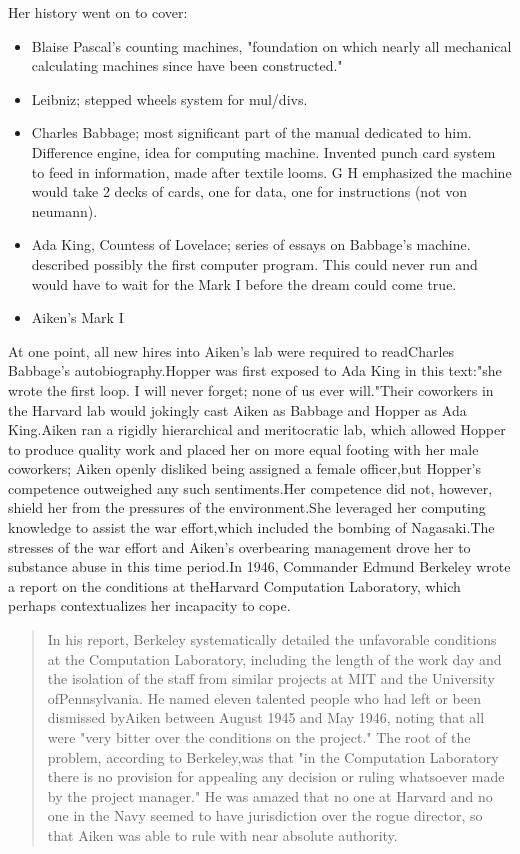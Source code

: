 Her history went on to cover:
\begin{itemize}
  \item Blaise Pascal's counting machines, "foundation on which
    nearly all mechanical
    calculating machines since have been constructed."
  \item Leibniz; stepped wheels system for mul/divs.
  \item Charles Babbage; most significant part of the manual dedicated to him.
    Difference engine, idea for computing machine. Invented punch card system to
    feed in information, made after textile looms. G H emphasized the
    machine would
    take 2 decks of cards, one for data, one for instructions (not
    von neumann).
  \item Ada King, Countess of Lovelace; series of essays on Babbage's machine.
    described possibly the first computer program. This could never
    run and would
    have to wait for the Mark I before the dream could come true.
  \item Aiken's Mark I
\end{itemize}

At one point, all new hires into Aiken's lab were
required to readCharles Babbage's autobiography.Hopper was first
exposed to Ada King in this text:"she wrote the first loop. I will
never forget; none of us ever will."Their coworkers in the Harvard
lab would jokingly cast Aiken as Babbage and Hopper as Ada King.Aiken
ran a rigidly hierarchical and meritocratic lab, which allowed
Hopper to produce quality work and placed her on more equal footing
with her male coworkers; Aiken openly disliked being assigned a female
officer,but Hopper's competence outweighed any such sentiments.Her
competence did not, however, shield her from the pressures of the
environment.She leveraged her computing knowledge to assist the war
effort,which included the bombing of Nagasaki.The stresses of the war
effort and Aiken's overbearing management drove her to substance abuse
in this time period.In 1946, Commander Edmund Berkeley wrote a report
on the conditions at theHarvard Computation Laboratory, which perhaps
contextualizes her incapacity to cope.

\begin{quotation}
  In his report, Berkeley systematically detailed the unfavorable
  conditions at the Computation Laboratory, including the length of
  the work day and the isolation of the staff from similar projects at
  MIT and the University ofPennsylvania. He named eleven talented
  people who had left or been dismissed byAiken between August 1945
  and May 1946, noting that all were "very bitter over the conditions
  on the project." The root of the problem, according to Berkeley,was
  that "in the Computation Laboratory there is no provision for
  appealing any decision or ruling whatsoever made by the project
  manager." He was amazed that no one at Harvard and no one in the
  Navy seemed to have jurisdiction over the rogue director, so that
  Aiken was able to rule with near absolute authority.
\end{quotation}


